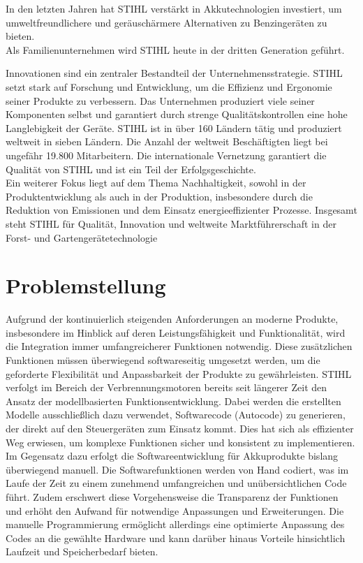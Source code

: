  In den letzten Jahren hat STIHL verstärkt in Akkutechnologien investiert, um umweltfreundlichere und geräuschärmere Alternativen zu Benzingeräten zu bieten. \\
Als Familienunternehmen wird STIHL heute in der dritten Generation geführt. 

Innovationen sind ein zentraler Bestandteil der Unternehmensstrategie. STIHL setzt stark auf Forschung und Entwicklung, um die Effizienz und Ergonomie seiner Produkte zu verbessern. Das Unternehmen produziert viele seiner Komponenten selbst und garantiert durch strenge Qualitätskontrollen eine hohe Langlebigkeit der Geräte. STIHL ist in über 160 Ländern tätig und produziert weltweit in sieben Ländern. Die Anzahl der weltweit Beschäftigten liegt bei ungefähr 19.800 Mitarbeitern. Die internationale Vernetzung garantiert die Qualität von STIHL und ist ein Teil der Erfolgsgeschichte. \\
Ein weiterer Fokus liegt auf dem Thema Nachhaltigkeit, sowohl in der Produktentwicklung als auch in der Produktion, insbesondere durch die Reduktion von Emissionen und dem Einsatz energieeffizienter Prozesse. Insgesamt steht STIHL für Qualität, Innovation und weltweite Marktführerschaft in der Forst- und Gartengerätetechnologie %

\section{Problemstellung}
Aufgrund der kontinuierlich steigenden Anforderungen an moderne Produkte, insbesondere im Hinblick auf deren Leistungsfähigkeit und Funktionalität, wird die Integration immer umfangreicherer Funktionen notwendig. Diese zusätzlichen Funktionen müssen überwiegend softwareseitig umgesetzt werden, um die geforderte Flexibilität und Anpassbarkeit der Produkte zu gewährleisten. STIHL verfolgt im Bereich der Verbrennungsmotoren bereits seit längerer Zeit den Ansatz der modellbasierten Funktionsentwicklung. Dabei werden die erstellten Modelle ausschließlich dazu verwendet, Softwarecode (Autocode) zu generieren, der direkt auf den Steuergeräten zum Einsatz kommt. Dies hat sich als effizienter Weg erwiesen, um komplexe Funktionen sicher und konsistent zu implementieren.\\
Im Gegensatz dazu erfolgt die Softwareentwicklung für Akkuprodukte bislang überwiegend manuell. Die Softwarefunktionen werden von Hand codiert, was im Laufe der Zeit zu einem zunehmend umfangreichen und unübersichtlichen Code führt. Zudem erschwert diese Vorgehensweise die Transparenz der Funktionen und erhöht den Aufwand für notwendige Anpassungen und Erweiterungen.
Die manuelle Programmierung ermöglicht allerdings eine optimierte Anpassung des Codes an die gewählte Hardware und kann darüber hinaus Vorteile hinsichtlich Laufzeit und Speicherbedarf bieten. 

